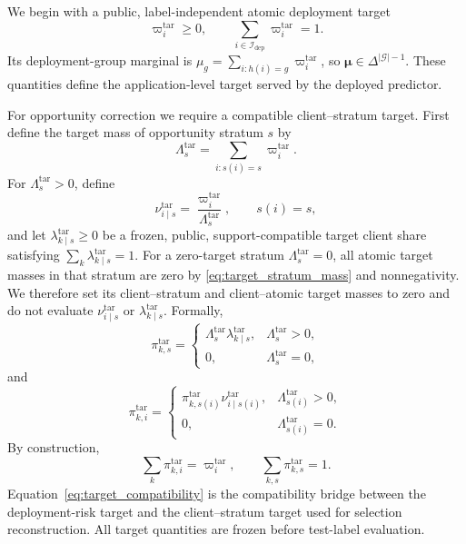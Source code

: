 \documentclass[letterpaper,journal]{IEEEtran}
\begin{document}
We begin with a public, label-independent atomic deployment target
\begin{equation}
    \varpi_i^{\mathrm{tar}}\ge0,
    \qquad
    \sum_{i\in\mathcal{I}_{\mathrm{dep}}}
    \varpi_i^{\mathrm{tar}}=1.
    \label{eq:atomic_target}
\end{equation}
Its deployment-group marginal is
$\mu_g=\sum_{i:h(i)=g}\varpi_i^{\mathrm{tar}}$, so
$\boldsymbol{\mu}\in\Delta^{|\mathcal{G}|-1}$.
These quantities define the application-level target served by the deployed
predictor.

For opportunity correction we require a compatible client--stratum target.
First define the target mass of opportunity stratum $s$ by
\begin{equation}
    \Lambda_s^{\mathrm{tar}}
    =
    \sum_{i:s(i)=s}\varpi_i^{\mathrm{tar}}.
    \label{eq:target_stratum_mass}
\end{equation}
For $\Lambda_s^{\mathrm{tar}}>0$, define
\begin{equation}
    \nu^{\mathrm{tar}}_{i\mid s}
    =
    \frac{\varpi_i^{\mathrm{tar}}}
         {\Lambda_s^{\mathrm{tar}}},
    \qquad s(i)=s,
    \label{eq:target_conditional_atomic}
\end{equation}
and let $\lambda^{\mathrm{tar}}_{k\mid s}\ge0$ be a frozen, public,
support-compatible target client share satisfying
$\sum_k\lambda^{\mathrm{tar}}_{k\mid s}=1$.
For a zero-target stratum $\Lambda_s^{\mathrm{tar}}=0$, all atomic target
masses in that stratum are zero by \eqref{eq:target_stratum_mass} and
nonnegativity.  We therefore set its client--stratum and client--atomic target
masses to zero and do not evaluate $\nu^{\mathrm{tar}}_{i\mid s}$ or
$\lambda^{\mathrm{tar}}_{k\mid s}$.  Formally,
\begin{equation}
 \pi^{\mathrm{tar}}_{k,s}
 =
 \begin{cases}
 \Lambda_s^{\mathrm{tar}}\lambda^{\mathrm{tar}}_{k\mid s},
 & \Lambda_s^{\mathrm{tar}}>0,\\
 0, & \Lambda_s^{\mathrm{tar}}=0,
 \end{cases}
 \label{eq:target_ks_mass}
\end{equation}
and
\begin{equation}
 \pi^{\mathrm{tar}}_{k,i}
 =
 \begin{cases}
 \pi^{\mathrm{tar}}_{k,s(i)}
 \nu^{\mathrm{tar}}_{i\mid s(i)},
 & \Lambda_{s(i)}^{\mathrm{tar}}>0,\\
 0, & \Lambda_{s(i)}^{\mathrm{tar}}=0.
 \end{cases}
 \label{eq:target_ki_mass}
\end{equation}
By construction,
\begin{equation}
    \sum_k\pi^{\mathrm{tar}}_{k,i}
    =
    \varpi_i^{\mathrm{tar}},
    \qquad
    \sum_{k,s}\pi^{\mathrm{tar}}_{k,s}=1.
    \label{eq:target_compatibility}
\end{equation}
Equation~\eqref{eq:target_compatibility} is the compatibility bridge between the
deployment-risk target and the client--stratum target used for selection
reconstruction.  All target quantities are frozen before test-label evaluation.
\end{document}
